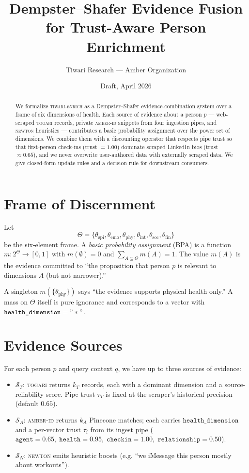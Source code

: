 \documentclass[11pt]{article}
\title{\textbf{Dempster--Shafer Evidence Fusion \\ for Trust-Aware Person Enrichment}}
\author{Tiwari Research --- Amber Organization}
\date{Draft, April 2026}
\begin{document}
\maketitle

\begin{abstract}
We formalize \textsc{tiwari-enrich} as a Dempster--Shafer
evidence-combination system over a frame of six dimensions of health.
Each source of evidence about a person $p$ --- web-scraped
\textsc{togari} records, private \textsc{amber-id} snippets from four
ingestion pipes, and \textsc{newton} heuristics --- contributes a
basic probability assignment over the power set of dimensions. We
combine them with a discounting operator that respects pipe trust so
that first-person check-ins (trust $=1.00$) dominate scraped LinkedIn
bios (trust $\approx 0.65$), and we never overwrite user-authored data
with externally scraped data. We give closed-form update rules and a
decision rule for downstream consumers.
\end{abstract}

\section{Frame of Discernment}

Let
\[
\Theta = \{\theta_{\text{spi}}, \theta_{\text{emo}}, \theta_{\text{phy}},
            \theta_{\text{int}}, \theta_{\text{soc}}, \theta_{\text{fin}}\}
\]
be the six-element frame. A \emph{basic probability assignment} (BPA)
is a function $m:2^\Theta\to[0,1]$ with $m(\emptyset)=0$ and
$\sum_{A\subseteq\Theta} m(A)=1$. The value $m(A)$ is the evidence
committed to ``the proposition that person $p$ is relevant to
dimensions $A$ (but not narrower).''

A singleton $m(\{\theta_{\text{phy}}\})$ says ``the evidence supports
physical health only.'' A mass on $\Theta$ itself is pure ignorance
and corresponds to a vector with $\texttt{health\_dimension}="*"$.

\section{Evidence Sources}

For each person $p$ and query context $q$, we have up to three
sources of evidence:
\begin{itemize}
\item $\mathcal{S}_T$: \textsc{togari} returns $k_T$ records, each
      with a dominant dimension and a source-reliability score. Pipe
      trust $\tau_T$ is fixed at the scraper's historical precision
      (default $0.65$).
\item $\mathcal{S}_A$: \textsc{amber-id} returns $k_A$ Pinecone
      matches; each carries $\texttt{health\_dimension}$ and a per-vector
      trust $\tau_i$ from its ingest pipe
      ($\texttt{agent}=0.65,\;\texttt{health}=0.95,\;\texttt{checkin}=1.00,\;\texttt{relationship}=0.50$).
\item $\mathcal{S}_N$: \textsc{newton} emits heuristic boosts (e.g.
      ``we iMessage this person mostly about workouts'').
\end{itemize}
\end{document}
